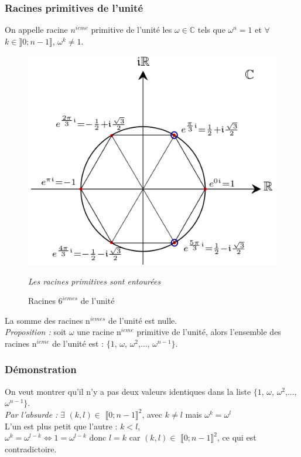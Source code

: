 \documentclass[a4paper,10pt]{book}
\newcommand{\C}{\mathbb{C}}
\begin{document}
\subsubsection{Racines primitives de l'unité}
On appelle racine $n^{ieme}$ primitive de l'unité les $\omega \in \C$ tels que $\omega^{n}=1$ et $\forall$ $k \in \rrbracket 0;n-1 \rrbracket$, $\omega^{k}\neq 1$.

\begin{figure}[h] \begin{center}
\includegraphics[scale=0.375]{images/204.png}
\caption{Racines $6^{iemes}$ de l'unité}
\emph{Les racines primitives sont entourées}
\end{center} \end{figure}

La somme des racines n$^{iemes}$ de l'unité est nulle.\\

\emph{Proposition : } soit $\omega$ une racine n$^{ieme}$ primitive de l'unité, alors l'ensemble des racines n$^{ieme}$ de l'unité est : $\{1$, $\omega$, $\omega^{2}$,..., $\omega^{n-1}\}$.

\subsubsection{Démonstration}
On veut montrer qu'il n'y a pas deux valeurs identiques dans la liste $\{1$, $\omega$, $\omega^{2}$,..., $\omega^{n-1}\}$.\\

\emph{Par l'absurde : } $\exists$ $(k,l) \in$ $\llbracket 0;n-1 \rrbracket^{2}$, avec $k\neq l$ mais $\omega^{k}=\omega^{l}$\\
L'un est plus petit que l'autre : $k<l$,\\ 
$\omega^{k}=\omega^{l-k} \Leftrightarrow  1=\omega^{l-k}$ donc $l=k$ car $(k,l) \in$ $\llbracket 0;n-1 \rrbracket^{2}$, ce qui est contradictoire.\\\\
\end{document}
